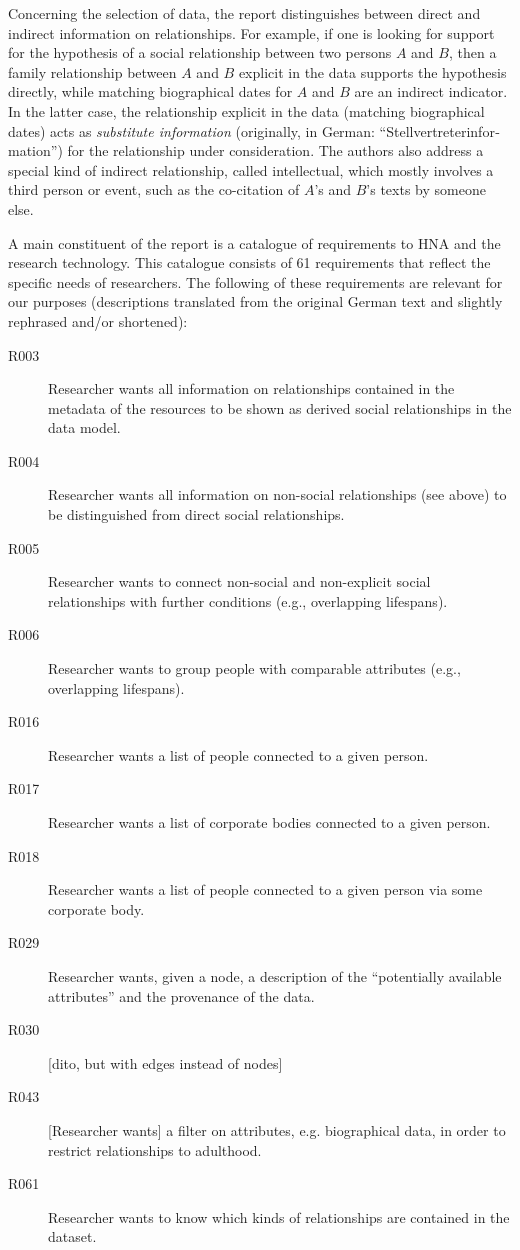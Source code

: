 
Concerning the selection of data, the report distinguishes between
direct and indirect information on relationships.
For example, if one is looking for support for the hypothesis of a social relationship
between two persons $A$ and $B$, then a family relationship between $A$ and $B$ explicit in the data
supports the hypothesis directly, while matching biographical dates for $A$ and $B$
are an indirect indicator. In the latter case, the relationship
explicit in the data (matching biographical dates) acts as \emph{substitute information}
(originally, in German: \enquote{\foreignlanguage{ngerman}{Stellvertreterinformation}}) for the relationship under consideration.
The authors also address a special kind of indirect relationship,
called intellectual, which mostly involves a third person
or event, such as the co-citation of $A$'s and $B$'s texts by someone else.

A main constituent of the report is a catalogue of requirements
to \gls{HNA} and the research technology. This catalogue consists of 61
requirements that reflect the specific needs of researchers.
The following of these requirements are relevant for our purposes
(descriptions translated from the original German text and slightly rephrased and/or shortened):
%
\goodbreak
%
\begin{description}
  \item[R003]
    Researcher wants all information on relationships contained in the metadata of the resources
    to be shown as derived social relationships in the data model.
  \item[R004]
    Researcher wants all information on non-social
    relationships (see above) to be distinguished from direct social relationships.
  \item[R005]
    Researcher wants to connect non-social and non-explicit social relationships
    with further conditions (e.g., overlapping lifespans).
  \item[R006]
    Researcher wants to group people with comparable attributes (e.g., overlapping lifespans).
  \item[R016]
    Researcher wants a list of people connected to a given person.
  \item[R017]
    Researcher wants a list of corporate bodies connected to a given person.
  \item[R018]
    Researcher wants a list of people connected to a given person via some corporate body.
  \item[R029]
    Researcher wants, given a node, a description of the \enquote{potentially available attributes}
    and the provenance of the data.
  \item[R030]
    [dito, but with edges instead of nodes]
  \item[R043]
    [Researcher wants] a filter on attributes, e.g. biographical data, in order to
    restrict relationships to adulthood.
  \item[R061]
    Researcher wants to know which kinds of relationships are contained in the dataset.
\end{description}

